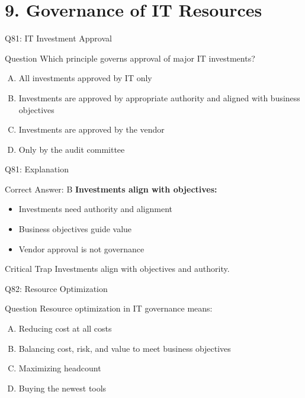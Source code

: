 \documentclass{beamer}
\begin{document}
	\section{9. Governance of IT Resources}
	
	\begin{frame}{Q81: IT Investment Approval}
		\begin{block}{Question}
			Which principle governs approval of major IT investments?
		\end{block}
		\begin{enumerate}[(A)]
			\item All investments approved by IT only
			\item Investments are approved by appropriate authority and aligned with business objectives
			\item Investments are approved by the vendor
			\item Only by the audit committee
		\end{enumerate}
	\end{frame}
	
	\begin{frame}{Q81: Explanation}
		\begin{block}{Correct Answer: B}
			\textbf{Investments align with objectives:}
			\begin{itemize}
				\item Investments need authority and alignment
				\item Business objectives guide value
				\item Vendor approval is not governance
			\end{itemize}
		\end{block}
		\begin{alertblock}{Critical Trap}
			Investments align with objectives and authority.
		\end{alertblock}
	\end{frame}
	
	\begin{frame}{Q82: Resource Optimization}
		\begin{block}{Question}
			Resource optimization in IT governance means:
		\end{block}
		\begin{enumerate}[(A)]
			\item Reducing cost at all costs
			\item Balancing cost, risk, and value to meet business objectives
			\item Maximizing headcount
			\item Buying the newest tools
		\end{enumerate}
	\end{frame}
	
\end{document}
